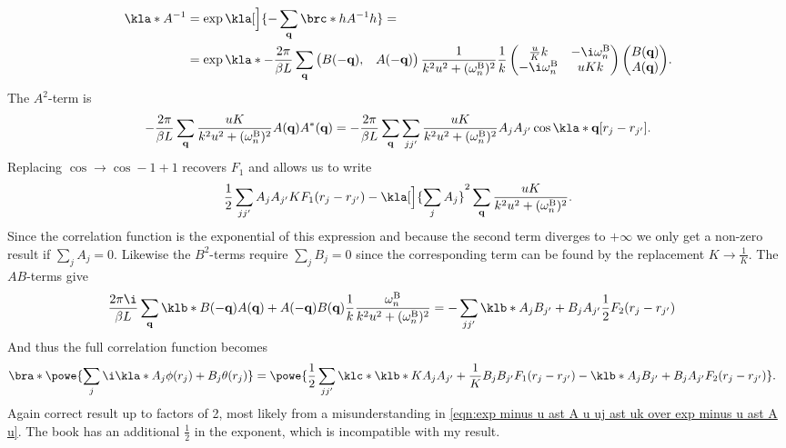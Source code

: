 \documentclass[english, parskip=full]{scrartcl}
\newcommand{\B}{\text{B}}
\newcommand{\TODO}[1]{\color{red!60!black} #1\color{black}}
\newcommand\QnA[1]{\bgroup\color{blue} #1\egroup}
\begin{document}
\begin{align}
\kla*{A^{-1}} &= \exp\kla[\Big]{-\sum_\textbf{q} \brc*{h}{A^{-1}}{h} } = \\
&= \exp\kla*{-\frac{2\pi}{\beta L} \sum_{\textbf{q}} \begin{pmatrix}
B(-\textbf{q}),& A(-\textbf{q})
\end{pmatrix} \frac{1}{k^2u^2 + (\omega_n^\B)^2} \frac{1}{k} \begin{pmatrix}
\frac{u}{K}k & -\i\omega_n^\B \\ -\i\omega_n^\B & uKk
\end{pmatrix} \begin{pmatrix}
B(\textbf{q}) \\ A(\textbf{q})
\end{pmatrix} }.
\end{align}
The $A^2$-term is
\begin{align}
-\frac{2\pi}{\beta L} \sum_{\textbf{q}} \frac{uK}{k^2u^2 + (\omega_n^\B)^2} A(\textbf{q})A^\ast(\textbf{q}) = -\frac{2\pi}{\beta L} \sum_{\textbf{q}} \sum_{jj'} \frac{uK}{k^2u^2 + (\omega_n^\B)^2} A_jA_{j'} \cos\kla*{\textbf{q}[r_j - r_{j'}]} .
\end{align}
Replacing $\cos \rightarrow \cos -1 + 1$ recovers $F_1$ and allows us to write
\begin{align}
\frac{1}{2} \sum_{jj'} A_jA_{j'} KF_1(r_j - r_{j'}) - \kla[\Big]{\sum_j A_j}^2 \sum_\textbf{q} \frac{uK}{k^2u^2 + (\omega_n^\B)^2}.
\end{align}
Since the correlation function is the exponential of this expression and because the second term diverges to $+\infty$ we only get a non-zero result if $\sum_jA_j = 0$.
Likewise the $B^2$-terms require $\sum_jB_j = 0$ since the corresponding term can be found by the replacement $K\rightarrow\frac{1}{K}$.
The $AB$-terms give
\begin{align}
\frac{2\pi\i}{\beta L} \sum_{\textbf{q}} \klb*{B(-\textbf{q})A(\textbf{q}) + A(-\textbf{q})B(\textbf{q})} \frac{1}{k} \frac{\omega_n^\B}{k^2u^2 + (\omega_n^\B)^2} &= -\sum_{jj'} \klb*{A_jB_{j'} + B_j A_{j'}} \frac{1}{2} F_2(r_j - r_{j'})
\end{align}
And thus the full correlation function becomes
\begin{align}
\bra*{\powe{\sum_j \i\kla*{A_j \phi(r_j) + B_j\theta(r_j)} } } &= \powe{\frac{1}{2} \sum_{jj'} \klc*{\klb*{KA_jA_{j'} + \frac{1}{K}B_jB_{j'}} F_1(r_j - r_{j'}) - \klb*{A_jB_{j'} + B_jA_{j'} } F_2(r_j - r_{j'})}  }. \label{eqn:general correlation function}
\end{align}
\TODO{Again correct result up to factors of 2, \QnA{most likely from a misunderstanding in \autoref{eqn:exp minus u ast A u uj ast uk over exp minus u ast A u}}.
The book has an additional $\frac{1}{2}$ in the exponent, which is incompatible with my result.}
\end{document}
